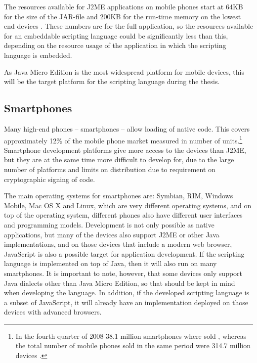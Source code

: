 \documentclass[11pt]{report}
\begin{document}
The resources available for J2ME applications on mobile phones start at 64KB for the size of the JAR-file and 200KB for the run-time memory on the lowest end devices \cite{nokia-optim}.
These numbers are for the full application, so the resources available for an embeddable scripting language could be significantly less than this, depending on the resource usage of the application in which the scripting language is embedded.

As Java Micro Edition is the most widespread platform for mobile devices, this will be the target platform for the scripting language during the thesis.

\subsection{Smartphones}
Many high-end phones -- smartphones --  allow loading of native code. 
This covers approximately 12\% of the mobile phone market measured in number of units.\footnote{In the fourth quarter of 2008 38.1 million smartphones where sold \cite{gartner}, whereas the total number of mobile phones sold in the same period were 314.7 million devices \cite{cellular-news}.}
Smartphone development platforms give more access to the devices than J2ME, but they are at the same time more difficult to develop for, due to the large number of platforms and limits on distribution due to requirement on cryptographic signing of code.

The main operating systems for smartphones are: Symbian, RIM, Windows Mobile, Mac OS X and Linux, which are very different operating systems, and on top of the operating system, different phones also have different user interfaces and programming models.
Development is not only possible as native applications, but many of the devices also support J2ME or other Java implementations, and on those devices that include a modern web browser, JavaScript is also a possible target for application development.
If the scripting language is implemented on top of Java, then it will also run on many smartphones.  It is important to note, however, that some devices only support Java dialects other than Java Micro Edition, so that should be kept in mind when developing the language. In addition, if the developed scripting language is a subset of JavaScript, it will already have an implementation deployed on those devices with advanced browsers.
\end{document}
